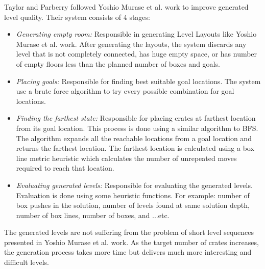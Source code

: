 \documentclass[letterpaper]{article}
\begin{document}
Taylor and Parberry\cite{sokobanLevelGenerationNew} followed Yoshio Murase et al.\cite{sokobanLevelGenerationOld} work to improve generated level quality. Their system consists of 4 stages:
\begin{itemize}
	\item \emph{Generating empty room:} Responsible in generating Level Layouts like Yoshio Murase et al.\cite{sokobanLevelGenerationOld} work. After generating the layouts, the system discards any level that is not completely connected, has huge empty space, or has number of empty floors less than the planned number of boxes and goals.
	\item \emph{Placing goals:} Responsible for finding best suitable goal locations. The system use a brute force algorithm to try every possible combination for goal locations.
	\item \emph{Finding the farthest state:} Responsible for placing crates at farthest location from its goal location. This process is done using a similar algorithm to BFS. The algorithm expands all the reachable locations from a goal location and returns the farthest location. The farthest location is calculated using a box line metric heuristic which calculates the number of unrepeated moves required to reach that location.
	\item \emph{Evaluating generated levels:} Responsible for evaluating the generated levels. Evaluation is done using some heuristic functions. For example: number of box pushes in the solution, number of levels found at same solution depth, number of box lines, number of boxes, and ...etc.  
\end{itemize}
The generated levels are not suffering from the problem of short level sequences presented in Yoshio Murase et al.\cite{sokobanLevelGenerationOld} work. As the target number of crates increases, the generation process takes more time but delivers much more interesting and difficult levels.\\\par
\end{document}

